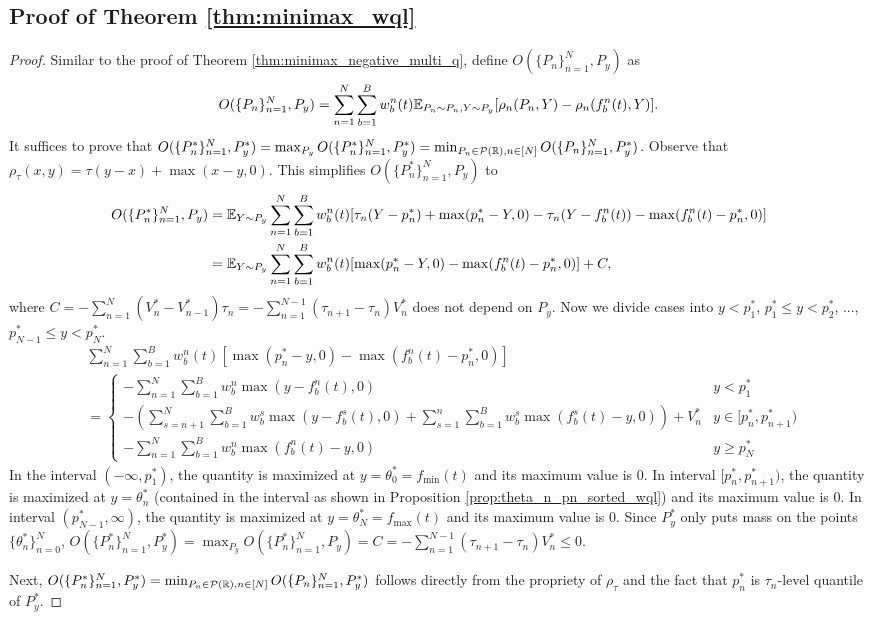 \subsection{Proof of Theorem \ref{thm:minimax_wql}} \label{pf:minimax_wql}
\begin{proof}
  Similar to the proof of Theorem \ref{thm:minimax_negative_multi_q}, define $O(\{P_n\}_{n=1}^N, P_y)$ as 
  \[
  O(\{P_n\}_{n=1}^N, P_y) = \sum_{n=1}^N \sum_{b=1}^B w_b^n(t) \mathbb{E}_{P_n \sim P_n, Y \sim P_y} [\rho_n(P_n, Y) - \rho_n(f_b^n(t), Y)].
  \]
  It suffices to prove that $O(\{P_n^*\}_{n=1}^N, P_y^*) = \max_{P_y} O(\{P_n^*\}_{n=1}^N, P_y^*) = \min_{P_n \in \mathcal{P}(\mathbb{R}), n \in [N]} O(\{P_n\}_{n=1}^N, P_y^*)$. Observe that $\rho_\tau(x,y) = \tau(y-x) + \max(x-y,0)$. This simplifies $O(\{P_n^*\}_{n=1}^N, P_y)$ to 
  \begin{align*}
  O(\{P_n^*\}_{n=1}^N, P_y) 
  & = \mathbb{E}_{Y \sim P_y} \sum_{n=1}^N \sum_{b=1}^B w_b^n(t) [\tau_n(Y-p_n^*) + \max(p_n^*-Y,0) - \tau_n(Y-f_b^n(t)) - \max(f_b^n(t)-p_n^*,0)] \\
  & = \mathbb{E}_{Y \sim P_y} \sum_{n=1}^N \sum_{b=1}^B w_b^n(t) [\max(p_n^*-Y,0) - \max(f_b^n(t)-p_n^*,0)] + C, 
  \end{align*}
  where $C = -\sum_{n=1}^N (V_n^* - V_{n-1}^*) \tau_n = - \sum_{n=1}^{N-1}(\tau_{n+1}-\tau_n) V_n^*$ does not depend on $P_y$. Now we divide cases into $y < p_1^*$, $p_1^* \leq y < p_2^*$, ..., $p_{N-1}^* \leq y < p_N^*$. 
  \begin{align*}
  & \sum_{n=1}^N \sum_{b=1}^B w_b^n(t) [\max(p_n^*-y,0) - \max(f_b^n(t)-p_n^*,0)] \\
  & = 
  \begin{cases}
      - \sum_{n=1}^N \sum_{b=1}^B w_b^n \max(y - f_b^n(t), 0) & y < p_1^* \\
      - \left( \sum_{s=n+1}^N \sum_{b=1}^B w_b^s \max(y - f_b^s(t), 0) + \sum_{s=1}^n \sum_{b=1}^B w_b^s \max(f_b^s(t)-y, 0) \right) + V_n^* & y \in [p_n^*, p_{n+1}^*)  \\
      - \sum_{n=1}^N \sum_{b=1}^B w_b^n \max(f_b^n(t) - y, 0) & y \geq p_N^*
  \end{cases}
  \end{align*}
  In the interval $(-\infty, p_1^*)$, the quantity is maximized at $y = \theta_0^* = f_\text{min}(t)$ and its maximum value is $0$. In interval $[p_n^*, p_{n+1}^*)$, the quantity is maximized at $y = \theta_n^*$ (contained in the interval as shown in Proposition \ref{prop:theta_n_pn_sorted_wql}) and its maximum value is $0$. In interval $(p_{N-1}^*, \infty)$, the quantity is maximized at $y = \theta_N^* = f_\text{max}(t)$ and its maximum value is $0$. Since $P_y^*$ only puts mass on the points $\{\theta_n^*\}_{n=0}^N$, $O(\{P_n^*\}_{n=1}^N, P_y^*) = \max_{P_y} O(\{P_n^*\}_{n=1}^N, P_y) = C = - \sum_{n=1}^{N-1}(\tau_{n+1}-\tau_n) V_n^* \leq 0$.
  
  Next, $O(\{P_n^*\}_{n=1}^N, P_y^*) = \min_{P_n \in \mathcal{P}(\mathbb{R}), n \in [N]} O(\{P_n\}_{n=1}^N, P_y^*)$ follows directly from the propriety of $\rho_\tau$ and the fact that $p_n^*$ is $\tau_n$-level quantile of $P_y^*$. 
\end{proof}


